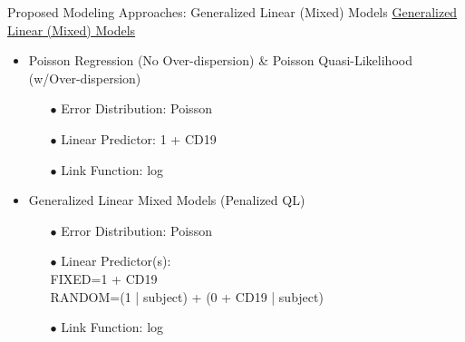 \documentclass[11pt]{beamer}
\begin{document}
\begin{frame}{Proposed Modeling Approaches: \small{Generalized Linear (Mixed) Models}}
\underline{Generalized Linear (Mixed) Models}
\vspace{5pt}
\begin{itemize}
	\item Poisson Regression (No Over-dispersion) \& Poisson Quasi-Likelihood (w/Over-dispersion)
	\vspace{5pt}
	\begin{itemize}
		\setlength{\itemsep}{1\baselineskip}
		\item[$\bullet$] Error Distribution: Poisson
		\item[$\bullet$] Linear Predictor: 1 + CD19
		\item[$\bullet$] Link Function: log
	\end{itemize}
	
	\vspace{5pt}
	
	\item Generalized Linear Mixed Models (Penalized QL)
	\vspace{5pt}
	\begin{itemize}
	\setlength{\itemsep}{1\baselineskip}
		\item[$\bullet$] Error Distribution: Poisson
		\item[$\bullet$] Linear Predictor(s):\\
		 FIXED=1 + CD19\\
		 RANDOM=(1 | subject) + (0 + CD19 | subject)
		\item[$\bullet$] Link Function: log
	\end{itemize}
\end{itemize}
\end{frame}
\end{document}
